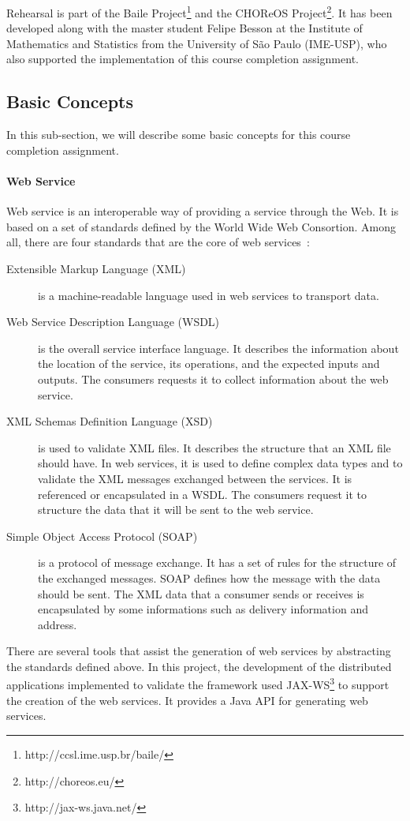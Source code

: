 Rehearsal is part of the Baile Project\footnote{http://ccsl.ime.usp.br/baile/} and the CHOReOS Project\footnote{http://choreos.eu/}. It has been developed along with the master student Felipe Besson at the Institute of Mathematics and Statistics from the University of S\~ao Paulo (IME-USP), who also supported the implementation of this course completion assignment.


\subsection{Basic Concepts}
In this sub-section, we will describe some basic concepts for this course completion assignment.

\paragraph{Web Service}
Web service is an interoperable way of providing a service through the Web. It is based on a set of standards defined by the World Wide Web Consortion. Among all, there are four standards that are the core of web services~\cite{Bean10}:
\begin{description}
\item[Extensible Markup Language (XML)] is a machine-readable language used in web services to transport data.
\item[Web Service Description Language (WSDL)] is the overall service interface language. It describes the information about the location of the service, its operations, and the expected inputs and outputs. The consumers requests it to collect information about the web service.
\item[XML Schemas Definition Language (XSD)] is used to validate XML files. It describes the structure that an XML file should have. In web services, it is used to define complex data types and to validate the XML messages exchanged between the services. It is referenced or encapsulated in a WSDL. The consumers request it to structure the data that it will be sent to the web service.
\item[Simple Object Access Protocol (SOAP)] is a protocol of message exchange. It has a set of rules for the structure of the exchanged messages. SOAP defines how the message with the data should be sent. The XML data that a consumer sends or receives is encapsulated by some informations such as delivery information and address.
\end{description}

There are several tools that assist the generation of web services by abstracting the standards defined above. In this project, the development of the distributed applications implemented to validate the framework used JAX-WS\footnote{http://jax-ws.java.net/} to support the creation of the web services. It provides a Java API for generating web services.

